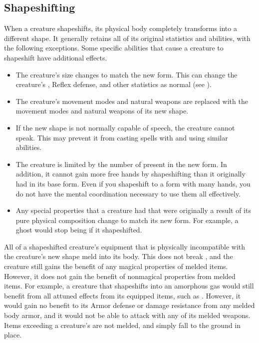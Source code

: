   \subsection{Shapeshifting}\label{Shapeshifting}
    When a creature shapeshifts, its physical body completely transforms into a different shape.
    It generally retains all of its original statistics and abilities, with the following exceptions.
    Some specific abilities that cause a creature to shapeshift have additional effects.
    \begin{itemize}
      \item The creature's size changes to match the new form.
        This can change the creature's , Reflex defense, and other statistics as normal (see ).
      \item The creature's  movement modes and natural weapons are replaced with the movement modes and natural weapons of its new shape.
      \item If the new shape is not normally capable of speech, the creature cannot speak.
        This may prevent it from casting spells with  and using similar abilities.
      \item The creature is limited by the number of  present in the new form.
        In addition, it cannot gain more free hands by shapeshifting than it originally had in its base form.
        Even if you shapeshift to a form with many hands, you do not have the mental coordination necessary to use them all effectively.
      \item Any special properties that a creature had that were originally a result of its pure physical composition change to match its new form.
        For example, a ghost would stop being  if it shapeshifted.
    \end{itemize}

    All of a shapeshifted creature's equipment that is physically incompatible with the creature's new shape meld into its body.
    This does not break , and the creature still gains the benefit of any magical properties of melded items.
    However, it does not gain the benefit of nonmagical properties from melded items.
    For example, a creature that shapeshifts into an amorphous gas would still benefit from all attuned effects from its equipped items, such as .
    However, it would gain no benefit to its Armor defense or damage resistance from any melded body armor, and it would not be able to attack with any of its melded weapons.
    Items exceeding a creature's  are not melded, and simply fall to the ground in place.

